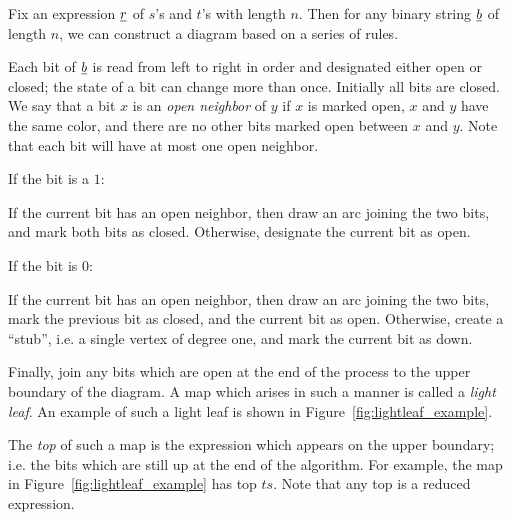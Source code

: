 Fix an expression $\underline{r}$ of $s$'s and $t$'s with length $n$.  Then for any binary string $\underline{b}$ of length $n$, we can construct a diagram based on a series of rules.

Each bit of $\underline{b}$ is read from left to right in order and designated either open or closed; the state of a bit can change more than once.  Initially all bits are closed.  We say that a bit $x$ is an \emph{open neighbor} of $y$ if $x$ is marked open, $x$ and $y$ have the same color, and there are no other bits marked open between $x$ and $y$.  Note that each bit will have at most one open neighbor.

\begin{itemize}
	\ii If the bit is a $1$:
	\begin{itemize}
		\ii If the current bit has an open neighbor, then draw an arc joining the two bits, and mark both bits as closed.
		\ii Otherwise, designate the current bit as open.
	\end{itemize}
	\ii If the bit is $0$:
	\begin{itemize}
		\ii If the current bit has an open neighbor, then draw an arc joining the two bits, mark the previous bit as closed, and the current bit as open.
		\ii Otherwise, create a ``stub'', i.e. a single vertex of degree one, and mark the current bit as down.
	\end{itemize}
\end{itemize}
Finally, join any bits which are open at the end of the process to the upper boundary of the diagram.  A map which arises in such a manner is called a \emph{light leaf}.  An example of such a light leaf is shown in Figure~\ref{fig:lightleaf_example}.

The \emph{top} of such a map is the expression which appears on the upper boundary; i.e. the bits which are still up at the end of the algorithm.  For example, the map in Figure~\ref{fig:lightleaf_example} has top $ts$.  Note that any top is a reduced expression.  


